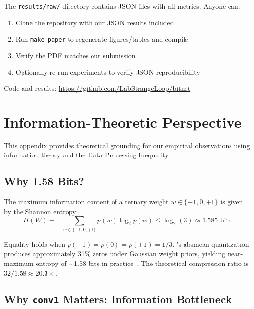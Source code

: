 \documentclass[10pt]{article}
\begin{document}
The \texttt{results/raw/} directory contains JSON files with all metrics. Anyone can:
\begin{enumerate}
    \item Clone the repository with our JSON results included
    \item Run \texttt{make paper} to regenerate figures/tables and compile
    \item Verify the PDF matches our submission
    \item Optionally re-run experiments to verify JSON reproducibility
\end{enumerate}

Code and results: \url{https://github.com/LabStrangeLoop/bitnet}


\section{Information-Theoretic Perspective}
\label{app:information_theory}

This appendix provides theoretical grounding for our empirical observations using information theory and the Data Processing Inequality.

\subsection{Why 1.58 Bits?}

The maximum information content of a ternary weight $w \in \{-1, 0, +1\}$ is given by the Shannon entropy:
\begin{equation}
    H(W) = -\sum_{w \in \{-1,0,+1\}} p(w) \log_2 p(w) \leq \log_2(3) \approx 1.585 \text{ bits}
\end{equation}

Equality holds when $p(-1) = p(0) = p(+1) = 1/3$. \bitnetb{}'s absmean quantization produces approximately 31\% zeros under Gaussian weight priors, yielding near-maximum entropy of $\sim$1.58 bits in practice~\cite{ma2024bitnetb158}. The theoretical compression ratio is $32 / 1.58 \approx 20.3\times$.

\subsection{Why \texttt{conv1} Matters: Information Bottleneck}
\end{document}

